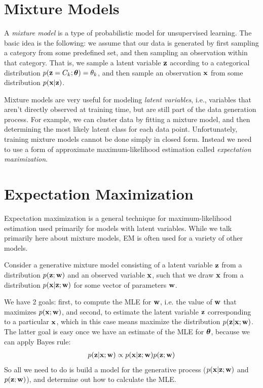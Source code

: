 \documentclass[12pt,letterpaper]{article}
\begin{document}
\section{Mixture Models}

A \emph{mixture model} is a type of probabilistic
model for unsupervised learning. The basic idea is the following:
we assume that our data is generated by 
first sampling a category from some predefined
set, and then sampling an observation within
that category. That is, we sample a latent
variable $\mathbf{z}$ according to a categorical
distribution $p(\mathbf{z} = C_k; \boldsymbol{\theta}) = \theta_k$, and
then sample an observation $\mathbf{x}$ from
some distribution $p(\mathbf{x} | \mathbf{z})$.

\smallskip

Mixture models are very useful for modeling
\emph{latent variables}, i.e., variables that aren't 
directly observed at training time, but are
still part of the data generation process. For 
example, we can cluster data by fitting a mixture
model, and then determining the most likely
latent class for each data point. Unfortunately,
training mixture models cannot be done 
simply in closed form. Instead we need to use
a form of approximate maximum-likelihood estimation
called \emph{expectation maximization}.



\section{Expectation Maximization}
Expectation maximization is a general technique for maximum-likelihood estimation used primarily for models with latent variables. While we talk primarily here about mixture models, EM is often used for a variety of other models.

\smallskip 

Consider a generative mixture model consisting of a latent variable $\mathbf{z}$ from a distribution $p(\mathbf{z}; \mathbf{w})$ and an observed variable $\mathbf{x}$, such that we draw $\mathbf{x}$ from a distribution $p(\mathbf{x} | \mathbf{z}; \mathbf{w})$ for some vector of parameters $\mathbf{w}$. 

\smallskip

We have 2 goals: first, to compute the MLE for $\mathbf{w}$, i.e. the value of $\mathbf{w}$ that maximizes $p(\mathbf{x}; \mathbf{w})$, and second, to estimate the latent variable $\mathbf{z}$ corresponding to a particular $\mathbf{x}$, which in this case means maximize the distribution $p(\mathbf{z} | \mathbf{x}; \mathbf{w})$. The latter goal is easy once we have an estimate of the MLE for $\boldsymbol{\theta}$, because we can apply Bayes rule:
\begin{align}p(\mathbf{z} | \mathbf{x}; \mathbf{w}) \propto p(\mathbf{x} | \mathbf{z}; \mathbf{w})p(\mathbf{z}; \mathbf{w})\end{align}
So all we need to do is build a model for the generative process ($p(\mathbf{x} | \mathbf{z}; \mathbf{w})$ and $p(\mathbf{z}; \mathbf{w})$), and determine out how to calculate the MLE.
\end{document}
